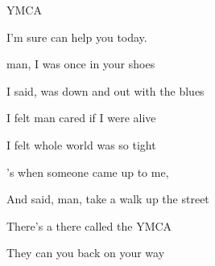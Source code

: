 \begin{SBSong}{YMCA}
\begin{SBVerse}
	I'm sure  can help you today.
  \end{SBVerse}
  \CBPageBrk
  \begin{SBVerse}
	 man, I was once in your shoes 
	
	I said,  was down and out with the blues 
	
	I felt  man cared if I were alive 
	
	I felt  whole world was so tight

	's when someone came up to me, 
	
	And said,  man, take a walk up the street 
	
	There's a  there called the YMCA 
	
	They can  you back on your way
  \end{SBVerse}
\end{SBSong}
